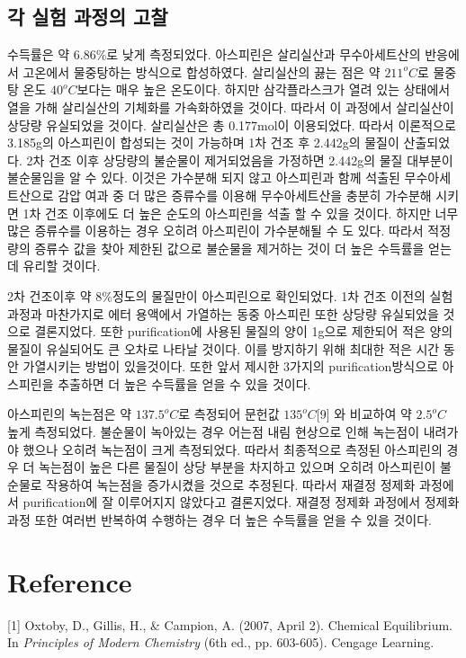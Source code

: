 \documentclass[%
 reprint,
 amsmath,amssymb,
 aps,
]{revtex4-2}
\begin{document}
\subsection{\label{sec:level2}각 실험 과정의 고찰}
 수득률은 약 $6.86\%$로 낮게 측정되었다. 아스피린은 살리실산과 무수아세트산의 반응에서 고온에서 물중탕하는 방식으로 합성하였다. 살리실산의 끓는 점은 약 $211^{o}C$로 물중탕 온도 $40^{o}C$보다는 매우 높은 온도이다. 하지만 삼각플라스크가 열려 있는 상태에서 열을 가해 살리실산의 기체화를 가속화하였을 것이다. 따라서 이 과정에서 살리실산이 상당량 유실되었을 것이다. 살리실산은 총 0.177mol이 이용되었다. 따라서 이론적으로 3.185g의 아스피린이 합성되는 것이 가능하며 1차 건조 후 2.442g의 물질이 산출되었다. 2차 건조 이후 상당량의 불순물이 제거되었음을 가정하면 2.442g의 물질 대부분이 불순물임을 알 수 있다. 이것은 가수분해 되지 않고 아스피린과 함께 석출된 무수아세트산으로 감압 여과 중 더 많은 증류수를 이용해 무수아세트산을 충분히 가수분해 시키면 1차 건조 이후에도 더 높은 순도의 아스피린을 석출 할 수 있을 것이다. 하지만 너무 많은 증류수를 이용하는 경우 오히려 아스피린이 가수분해될 수 도 있다. 따라서 적정량의 증류수 값을 찾아 제한된 값으로 불순물을 제거하는 것이 더 높은 수득률을 얻는데 유리할 것이다.

2차 건조이후 약 8\%정도의 물질만이 아스피린으로 확인되었다. 1차 건조 이전의 실험 과정과 마찬가지로 에터 용액에서 가열하는 동중 아스피린 또한 상당량 유실되었을 것으로 결론지었다. 또한 purification에 사용된 물질의 양이 1g으로 제한되어 적은 양의 물질이 유실되어도 큰 오차로 나타날 것이다. 이를 방지하기 위해 최대한 적은 시간 동안 가열시키는 방법이 있을것이다. 또한 앞서 제시한 3가지의 purification방식으로 아스피린을 추출하면 더 높은 수득률을 얻을 수 있을 것이다.

아스피린의 녹는점은 약 $137.5^{o}C$로 측정되어 문헌값 $135^{o}C$[9] 와 비교하여 약 $2.5^{o}C$ 높게 측정되었다. 불순물이 녹아있는 경우 어는점 내림 현상으로 인해 녹는점이 내려가야 했으나 오히려 녹는점이 크게 측정되었다. 따라서 최종적으로 측정된 아스피린의 경우 더 녹는점이 높은 다른 물질이 상당 부분을 차지하고 있으며 오히려 아스피린이 불순물로 작용하여 녹는점을 증가시켰을 것으로 추정된다. 따라서 재결정 정제화 과정에서 purification에 잘 이루어지지 않았다고 결론지었다. 재결정 정제화 과정에서 정제화 과정 또한 여러번 반복하여 수행하는 경우 더 높은 수득률을 얻을 수 있을 것이다. 


\section{\label{sec:level1}Reference}
[1] Oxtoby, D., Gillis, H., \& Campion, A. (2007, April 2). Chemical Equilibrium. In \textit{Principles of Modern Chemistry} (6th ed., pp. 603-605). Cengage Learning.
\end{document}
